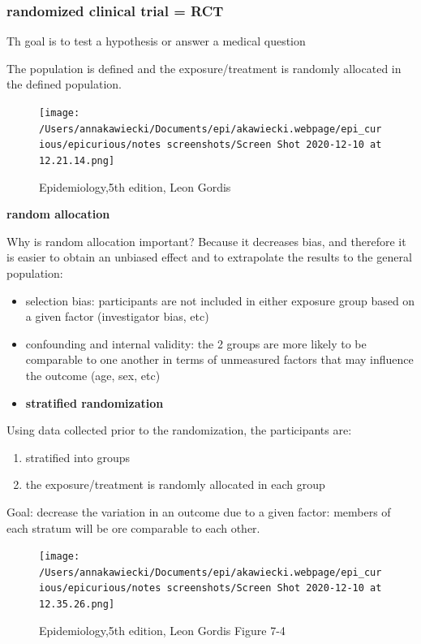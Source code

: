 \documentclass[
]{article}
\providecommand{\tightlist}{%
  \setlength{\itemsep}{0pt}\setlength{\parskip}{0pt}}
\begin{document}
\hypertarget{randomized-clinical-trial-rct}{%
\subsubsection{randomized clinical trial =
RCT}\label{randomized-clinical-trial-rct}}

Th goal is to test a hypothesis or answer a medical question

The population is defined and the exposure/treatment is randomly
allocated in the defined population.

\begin{figure}
\centering
\texttt{[image: /Users/annakawiecki/Documents/epi/akawiecki.webpage/epi\_curious/epicurious/notes screenshots/Screen Shot 2020-12-10 at 12.21.14.png]}
\caption{Epidemiology,5th edition, Leon Gordis}
\end{figure}

\textbf{random allocation}

Why is random allocation important? Because it decreases bias, and
therefore it is easier to obtain an unbiased effect and to extrapolate
the results to the general population:

\begin{itemize}
\item
  selection bias: participants are not included in either exposure group
  based on a given factor (investigator bias, etc)
\item
  confounding and internal validity: the 2 groups are more likely to be
  comparable to one another in terms of unmeasured factors that may
  influence the outcome (age, sex, etc)
\item
  \textbf{stratified randomization}
\end{itemize}

Using data collected prior to the randomization, the participants are:

\begin{enumerate}
\def\labelenumi{\arabic{enumi}.}
\tightlist
\item
  stratified into groups
\item
  the exposure/treatment is randomly allocated in each group
\end{enumerate}

Goal: decrease the variation in an outcome due to a given factor:
members of each stratum will be ore comparable to each other.

\begin{figure}
\centering
\texttt{[image: /Users/annakawiecki/Documents/epi/akawiecki.webpage/epi\_curious/epicurious/notes screenshots/Screen Shot 2020-12-10 at 12.35.26.png]}
\caption{Epidemiology,5th edition, Leon Gordis Figure 7-4}
\end{figure}
\end{document}
